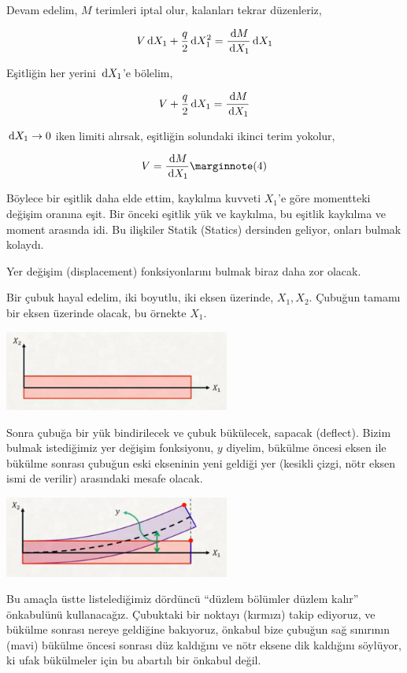 \documentclass[12pt,fleqn]{article}\usepackage{../../common}
\begin{document}
Devam edelim, $M$ terimleri iptal olur, kalanları tekrar düzenleriz,

$$
V \,\mathrm{d} X_1 + \frac{q}{2} \,\mathrm{d} X_1^2 = \frac{\,\mathrm{d} M}{\,\mathrm{d} X_1} \,\mathrm{d} X_1
$$

Eşitliğin her yerini $\,\mathrm{d} X_1$'e bölelim,

$$
V + \frac{q}{2} \,\mathrm{d} X_1 = \frac{\,\mathrm{d} M}{\,\mathrm{d} X_1} 
$$

$\,\mathrm{d} X_1 \to 0$ iken limiti alırsak, eşitliğin solundaki ikinci terim yokolur,

$$
V = \frac{\ud M}{\ud X_1}
\mlabel{4}
$$

Böylece bir eşitlik daha elde ettim, kaykılma kuvveti $X_1$'e göre momentteki
değişim oranına eşit. Bir önceki eşitlik yük ve kaykılma, bu eşitlik kaykılma ve
moment arasında idi. Bu ilişkiler Statik (Statics) dersinden geliyor, onları
bulmak kolaydı.

Yer değişim (displacement) fonksiyonlarını bulmak biraz daha zor olacak. 

Bir çubuk hayal edelim, iki boyutlu, iki eksen üzerinde, $X_1,X_2$.
Çubuğun tamamı bir eksen üzerinde olacak, bu örnekte $X_1$.

\includegraphics[width=20em]{phy_020_strs_02_12.jpg}

Sonra çubuğa bir yük bindirilecek ve çubuk bükülecek, sapacak (deflect).  Bizim
bulmak istediğimiz yer değişim fonksiyonu, $y$ diyelim, bükülme öncesi eksen ile
bükülme sonrası çubuğun eski ekseninin yeni geldiği yer (kesikli çizgi, nötr
eksen ismi de verilir) arasındaki mesafe olacak.

\includegraphics[width=20em]{phy_020_strs_02_13.jpg}

Bu amaçla üstte listelediğimiz dördüncü ``düzlem bölümler düzlem kalır''
önkabulünü kullanacağız. Çubuktaki bir noktayı (kırmızı) takip ediyoruz, ve
bükülme sonrası nereye geldiğine bakıyoruz, önkabul bize çubuğun sağ sınırının
(mavi) bükülme öncesi sonrası düz kaldığını ve nötr eksene dik kaldığını
söylüyor, ki ufak bükülmeler için bu abartılı bir önkabul değil.
\end{document}

